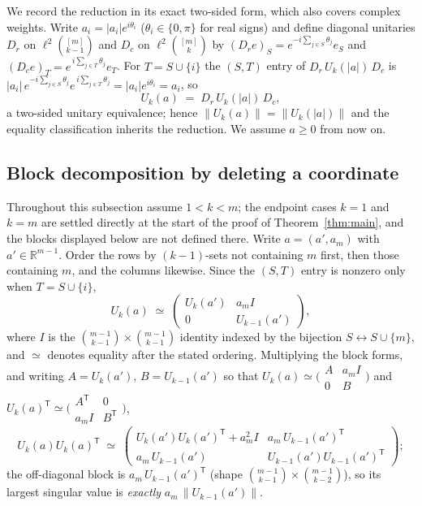 \documentclass[11pt]{article}
\theoremstyle{remark}
\begin{document}
We record the reduction in its exact two-sided form, which also covers
complex weights. Write $a_i=|a_i|e^{i\theta_i}$ ($\theta_i\in\{0,\pi\}$ for
real signs) and define diagonal unitaries $D_r$ on
$\ell^2\binom{[m]}{k-1}$ and $D_c$ on $\ell^2\binom{[m]}{k}$ by
$(D_r e)_S=e^{-i\sum_{j\in S}\theta_j}e_S$ and
$(D_c e)_T=e^{\,i\sum_{j\in T}\theta_j}e_T$. For $T=S\cup\{i\}$ the
$(S,T)$ entry of $D_r\,U_k(|a|)\,D_c$ is
$|a_i|\,e^{-i\sum_{j\in S}\theta_j}e^{\,i\sum_{j\in T}\theta_j}=
|a_i|e^{i\theta_i}=a_i$, so
\begin{equation}\label{eq:phase}
U_k(a)\;=\;D_r\,U_k(|a|)\,D_c ,
\end{equation}
a two-sided unitary equivalence; hence
$\|U_k(a)\|=\|U_k(|a|)\|$ and the equality classification inherits the
reduction. We assume $a\ge0$ from now on.

\subsection{Block decomposition by deleting a coordinate}\label{subsec:block}

Throughout this subsection assume $1<k<m$; the endpoint cases $k=1$ and $k=m$
are settled directly at the start of the proof of Theorem~\ref{thm:main}, and
the blocks displayed below are not defined there. Write $a=(a',a_m)$ with
$a'\in\mathbb{R}^{m-1}$. Order the rows by
$(k-1)$-sets not containing $m$ first, then those containing $m$, and the
columns likewise. Since the $(S,T)$ entry is nonzero only when
$T=S\cup\{i\}$,
\begin{equation}\label{eq:block}
U_k(a)\;\simeq\;
\begin{pmatrix} U_k(a') & a_m I\\[2pt] 0 & U_{k-1}(a') \end{pmatrix},
\end{equation}
where $I$ is the $\binom{m-1}{k-1}\times\binom{m-1}{k-1}$ identity indexed
by the bijection $S\leftrightarrow S\cup\{m\}$, and $\simeq$ denotes
equality after the stated ordering. Multiplying the block forms, and
writing $A=U_k(a')$, $B=U_{k-1}(a')$ so that
$U_k(a)\simeq\bigl(\begin{smallmatrix}A&a_mI\\0&B\end{smallmatrix}\bigr)$
and
$U_k(a)^{\mathsf T}\simeq\bigl(\begin{smallmatrix}A^{\mathsf T}&0\\a_mI&B^{\mathsf T}\end{smallmatrix}\bigr)$,
\begin{equation}\label{eq:gram}
U_k(a)U_k(a)^{\mathsf T}\;\simeq\;
\begin{pmatrix}
U_k(a')U_k(a')^{\mathsf T}+a_m^2 I & a_m\,U_{k-1}(a')^{\mathsf T}\\
a_m\,U_{k-1}(a') & U_{k-1}(a')U_{k-1}(a')^{\mathsf T}
\end{pmatrix};
\end{equation}
the off-diagonal block is $a_m\,U_{k-1}(a')^{\mathsf T}$ (shape
$\binom{m-1}{k-1}\times\binom{m-1}{k-2}$), so its largest singular value
is \emph{exactly} $a_m\,\|U_{k-1}(a')\|$.
\end{document}
